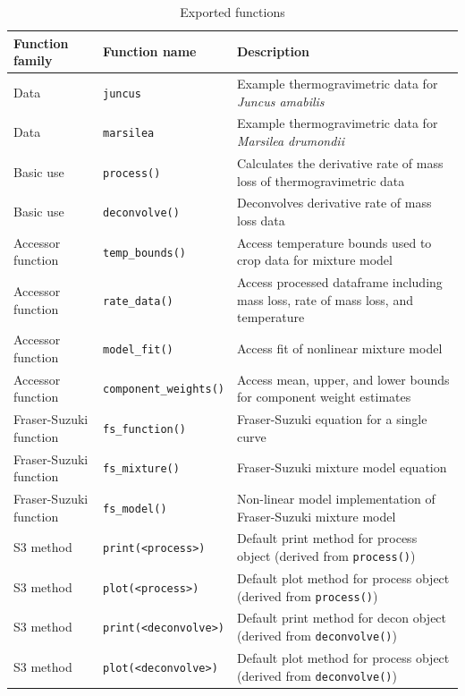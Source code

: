 \documentclass{jors}\usepackage[]{graphicx}\usepackage[]{color}
\begin{document}
\begin{table}[!ht]
	\caption{Exported functions}
	\label{Tab:functions}
	\centering
	\footnotesize
	\begin{tabularx}{\linewidth}{llX}
        		\toprule
        		Function family & Function name & Description \\
        		\midrule
		Data & \verb|juncus| & Example thermogravimetric data for \textit{Juncus amabilis} \\
		Data & \verb|marsilea| & Example thermogravimetric data for \textit{Marsilea drumondii} \\
		Basic use & \verb|process()| & Calculates the derivative rate of mass loss of thermogravimetric data \\
		Basic use & \verb|deconvolve()| & Deconvolves derivative rate of mass loss data \\
		Accessor function & \verb|temp_bounds()| & Access temperature bounds used to crop data for mixture model \\
		Accessor function & \verb|rate_data()| & Access processed dataframe including mass loss, rate of mass loss, and temperature \\
		Accessor function & \verb|model_fit()| & Access fit of nonlinear mixture model \\
		Accessor function & \verb|component_weights()| & Access mean, upper, and lower bounds for component weight estimates \\
		Fraser-Suzuki function & \verb|fs_function()| & Fraser-Suzuki equation for a single curve \\
		Fraser-Suzuki function & \verb|fs_mixture()| & Fraser-Suzuki mixture model equation \\
		Fraser-Suzuki function & \verb|fs_model()| & Non-linear model implementation of Fraser-Suzuki mixture model \\
		S3 method & \verb|print(<process>)| & Default print method for process object (derived from \verb|process()|) \\
		S3 method & \verb|plot(<process>)| & Default plot method for process object (derived from \verb|process()|) \\
		S3 method & \verb|print(<deconvolve>)| & Default print method for decon object (derived from \verb|deconvolve()|) \\
		S3 method & \verb|plot(<deconvolve>)| & Default plot method for process object (derived from \verb|deconvolve()|) \\
        		\bottomrule
	\end{tabularx}
\end{table}
\end{document}
